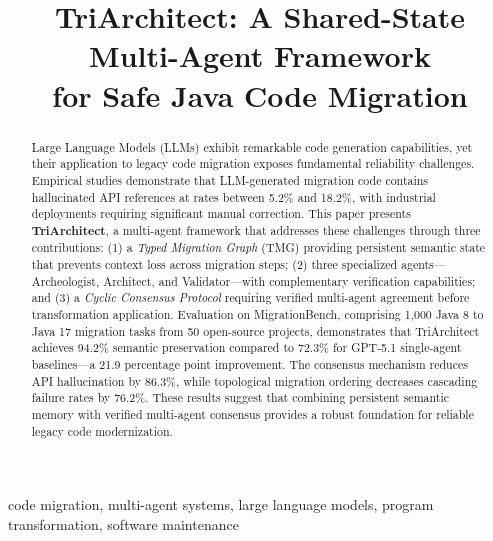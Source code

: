 \documentclass[10pt,conference]{IEEEtran}
\begin{document}
\title{TriArchitect: A Shared-State Multi-Agent Framework\\for Safe Java Code Migration}

\author{
}

\maketitle

\begin{abstract}
Large Language Models (LLMs) exhibit remarkable code generation capabilities, yet their application to legacy code migration exposes fundamental reliability challenges. Empirical studies demonstrate that LLM-generated migration code contains hallucinated API references at rates between 5.2\% and 18.2\%, with industrial deployments requiring significant manual correction. This paper presents \textbf{TriArchitect}, a multi-agent framework that addresses these challenges through three contributions: (1) a \textit{Typed Migration Graph} (TMG) providing persistent semantic state that prevents context loss across migration steps; (2) three specialized agents---Archeologist, Architect, and Validator---with complementary verification capabilities; and (3) a \textit{Cyclic Consensus Protocol} requiring verified multi-agent agreement before transformation application. Evaluation on MigrationBench, comprising 1,000 Java 8 to Java 17 migration tasks from 50 open-source projects, demonstrates that TriArchitect achieves 94.2\% semantic preservation compared to 72.3\% for GPT-5.1 single-agent baselines---a 21.9 percentage point improvement. The consensus mechanism reduces API hallucination by 86.3\%, while topological migration ordering decreases cascading failure rates by 76.2\%. These results suggest that combining persistent semantic memory with verified multi-agent consensus provides a robust foundation for reliable legacy code modernization.
\end{abstract}

\begin{IEEEkeywords}
code migration, multi-agent systems, large language models, program transformation, software maintenance
\end{IEEEkeywords}

\end{document}
